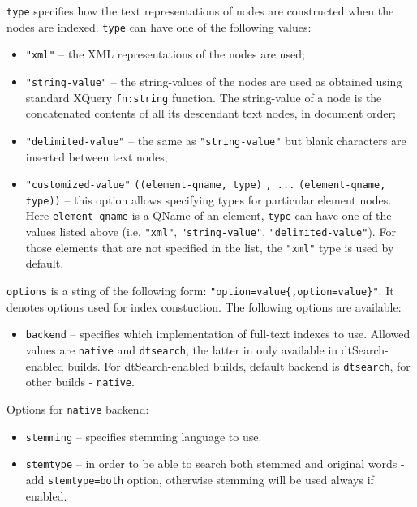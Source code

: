 \documentclass[a4paper,12pt]{article}
\begin{document}
\verb!type! specifies how the text representations of nodes are constructed when
the nodes are indexed. \verb!type! can have one of the following values:

\begin{itemize}
\item \verb!"xml"! -- the XML representations of the nodes are used;
\item \verb!"string-value"! -- the string-values of the nodes are used as
obtained using standard XQuery \verb!fn:string! function. The string-value of a
node is the concatenated contents of all its descendant text nodes, in document
order;
\item \verb!"delimited-value"! -- the same as \verb!"string-value"! but blank
characters are inserted between text nodes;
\item \verb!"customized-value"! \verb!((element-qname, type)! \verb!, ...!
\verb!(element-qname, type))! -- this option allows specifying types for
particular element nodes. Here \verb!element-qname! is a QName of an element,
\verb!type! can have one of the values listed above (i.e. \verb!"xml"!,
\verb!"string-value"!, \verb!"delimited-value"!). For those elements that are
not specified in the list, the \verb!"xml"! type is used by default.
\end{itemize}

\verb!options! is a sting of the following form:
\verb!"option=value{,option=value}"!. It denotes options used for index
constuction. The following options are available:

\begin{itemize}
\item \verb!backend! -- specifies which implementation of full-text indexes to
use. Allowed values are \verb!native! and \verb!dtsearch!, the latter in only
available in dtSearch-enabled builds. For dtSearch-enabled builds, default
backend is \verb!dtsearch!, for other builds - \verb!native!.
\end{itemize}

Options for \verb!native! backend:

\begin{itemize}
\item \verb!stemming! -- specifies stemming language to use.
\item \verb!stemtype! -- in order to be able to search both stemmed and original
words - add \verb!stemtype=both! option, otherwise stemming will be used always
if enabled.
\end{itemize}
\end{document}
